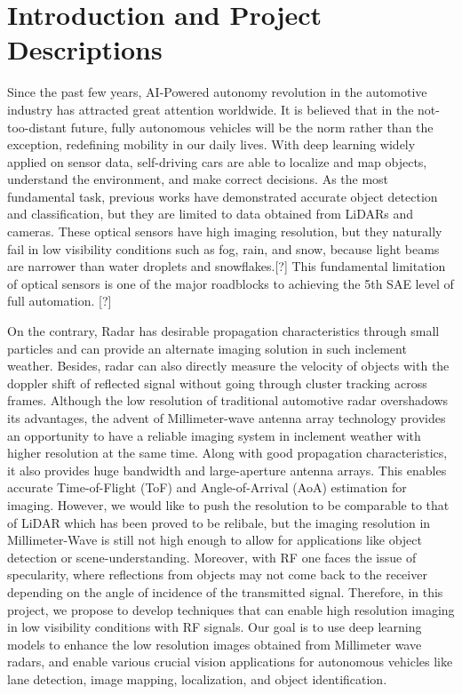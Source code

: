\section{Introduction and Project Descriptions}


Since the past few years, AI-Powered autonomy revolution in the automotive industry has attracted great attention worldwide. It is believed that in the not-too-distant future, fully
autonomous vehicles will be the norm rather than the exception, redefining mobility in our daily lives. With deep learning widely applied on sensor data, self-driving cars are able to localize and map objects, understand the environment, and make correct decisions. As the most fundamental task, previous works have demonstrated accurate object detection and classification, but they are limited to data obtained from LiDARs and cameras. These optical sensors have high imaging resolution, but they naturally fail in low visibility conditions such as fog, rain, and snow, because light beams are narrower than water droplets and snowflakes.[?] This fundamental limitation of optical sensors is one of the major roadblocks to achieving the 5th SAE level of full automation. [?]  

On the contrary, Radar has desirable propagation characteristics through small particles and can provide an alternate imaging solution in such inclement weather. Besides, radar can also directly measure the velocity of objects with the doppler shift of reflected signal without going through cluster tracking across frames. Although the low resolution of traditional automotive radar overshadows its advantages, the advent of Millimeter-wave antenna array technology provides an opportunity to have a reliable imaging system in inclement weather with higher resolution at the same time. Along with good propagation characteristics, it also provides huge bandwidth and large-aperture antenna arrays. This enables accurate Time-of-Flight (ToF) and Angle-of-Arrival (AoA) estimation for imaging. However, we would like to push the resolution to be comparable to that of LiDAR which has been proved to be relibale, but the imaging resolution in Millimeter-Wave is still not high enough to allow for applications like object detection or scene-understanding. Moreover, with RF one faces the issue of specularity, where reflections from objects may not come back to the receiver depending on the angle of incidence of the transmitted signal. Therefore, in this project, we propose to develop techniques that can enable high resolution imaging in low visibility conditions with RF signals. Our goal is to use deep learning models to enhance the low resolution images obtained from Millimeter wave radars, and enable various crucial vision applications for autonomous vehicles like lane detection, image mapping, localization, and object identification.
